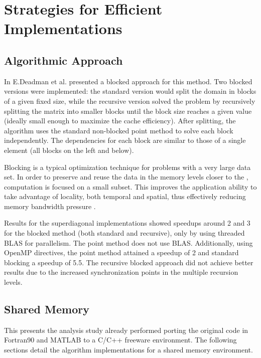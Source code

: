 \section{Strategies for Efficient Implementations}
\label{sec:implementations}

\subsection{Algorithmic Approach}
In \cite{Deadman:Higham:Ralha:2012} E.Deadman et al. presented a blocked approach for this method. Two blocked versions were implemented: the standard version would split the domain in blocks of a given fixed size, while the recursive version solved the problem by recursively splitting the matrix into smaller blocks until the block size reaches a given value (ideally small enough to maximize the cache efficiency). After splitting, the algorithm uses the standard non-blocked point method to solve each block independently. The dependencies for each block are similar to those of a single element (all blocks on the left and below).

Blocking is a typical optimization technique for problems with a very large data set. In order to preserve and reuse the data in the memory levels closer to the \cpu, computation is focused on a small subset. This improves the application ability to take advantage of locality, both temporal and spatial, thus effectively reducing memory bandwidth pressure \cite{Intel:CacheBlockingTechniques}.

Results for the superdiagonal implementations showed speedups around 2 and 3 for the blocked method (both standard and recursive), only by using threaded BLAS for parallelism.
The point method does not use BLAS.					
Additionally, using OpenMP directives, the point method attained a speedup of 2 and standard blocking a speedup of 5.5.
The recursive blocked approach did not achieve better results due to the increased synchronization points in the multiple recursion levels.


\subsection{Shared Memory}
\label{sec:implementations:sharedmem}
This  presents the analysis study already performed porting the original \nag code in Fortran90 and MATLAB to a C/C++ freeware environment. The following sections detail the algorithm implementations for a shared memory environment.

